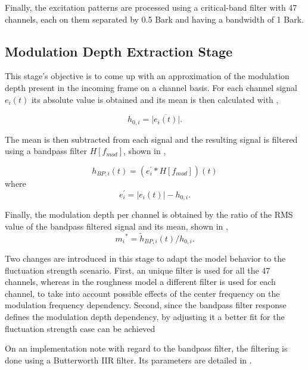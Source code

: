 \documentclass[../main.tex]{subfiles}
\begin{document}
\begin{modelchapter}
Finally, the excitation patterns are processed using a critical-band filter with
47 channels, each on them separated by 0.5 Bark and having a bandwidth of 1
Bark.

\subsection{Modulation Depth Extraction Stage}

This stage's objective is to come up with an approximation of the modulation
depth present in the incoming frame on a channel basis. For each channel signal
$e_{i}(t)$ its absolute value is obtained and its mean is then calculated with
,

\begin{equation}
  h_{0,i} = \overline{|e_{i}(t)|}.
  \label{eq:h0i}
\end{equation}

The mean is then subtracted from each signal and the resulting signal is
filtered using a bandpass filter $H[f_{mod}]$, shown in ,

\begin{equation}
  h_{BP,i}(t) = (e_{i}^{\prime} * H[f_{mod}])(t)
  \label{eq:hBPi}
\end{equation}
where
\begin{equation}
  e_{i}^{\prime} = |e_{i}(t)| - h_{0,i}.
\end{equation}

Finally, the modulation depth per channel is obtained by the ratio of the
\gls{RMS} value of the bandpass filtered signal and its mean, shown in
,
\begin{equation}
  {m_i}^* = \tilde{h}_{BP,i}(t)/h_{0,i}.
  \label{eq:mi*}
\end{equation}

Two changes are introduced in this stage to adapt the model behavior to the
fluctuation strength scenario. First, an unique filter is used for all the 47
channels, whereas in the roughness model a different filter is used for each
channel, to take into account possible effects of the center frequency on the
modulation frequency dependency. Second, since the bandpass filter response
defines the modulation depth dependency, by adjusting it a better fit for the
fluctuation strength case can be achieved

On an implementation note with regard to the bandpass filter, the filtering is
done using a Butterworth \gls{IIR} filter. Its parameters are detailed in
.


\end{modelchapter}
\end{document}
